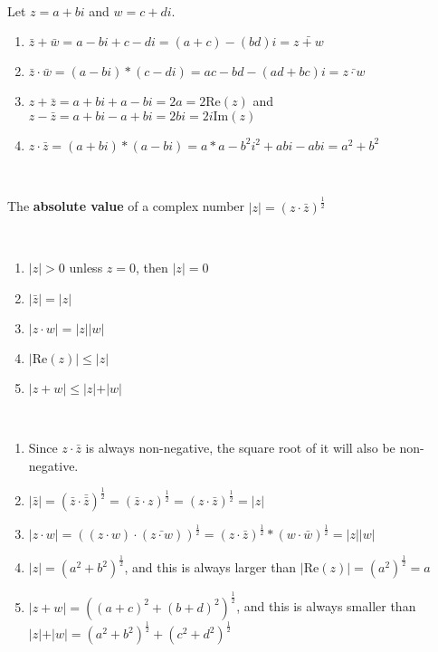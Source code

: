 \documentclass{article}
\begin{document}
\begin{customproof}
\

Let $z = a+bi$ and $w = c+di$.

\begin{enumerate}
    \item $\bar{z} + \bar{w} = a-bi + c - di = (a+c) - (bd)i = \bar{z+w}$
    \item $\bar{z} \cdot \bar{w} = (a-bi) * (c-di) = ac-bd - (ad+bc)i = \bar{z \cdot w}$
    \item $z + \bar{z} = a+bi + a - bi = 2a = 2\text{Re}(z)$ and $z - \bar{z} = a+bi - a + bi = 2bi = 2i \text{Im}(z)$
    \item $z \cdot \bar{z} = (a+bi) * (a-bi) = a*a - b^2i^2 + abi - abi = a^2 + b^2$
\end{enumerate}
\end{customproof}

\begin{definition}
\

The \textbf{absolute value} of a complex number $\vert z \vert = (z \cdot \bar{z})^{\frac{1}{2}}$ 
\end{definition}

\begin{theorem}
\

\begin{enumerate}
    \item $\vert z\vert > 0$ unless $z = 0$, then $\vert z\vert =0$
    \item $\vert \bar{z}\vert  = \vert z\vert$
    \item $\vert z \cdot w\vert = \vert z\vert \vert w\vert$
    \item $\vert \text{Re}(z)\vert \leq \vert z\vert$
    \item $\vert z+w\vert \leq \vert z\vert + \vert w\vert$             
\end{enumerate}
\end{theorem}

\begin{customproof}
\

\begin{enumerate}
    \item Since $z \cdot \bar{z}$ is always non-negative, the square root of it will also be non-negative.
    \item $ \vert \bar{z} \vert = (\bar{z} \cdot \bar{\bar{z}})^{\frac{1}{2}}  =  (\bar{z} \cdot z)^{\frac{1}{2}}  = (z \cdot \bar{z})^{\frac{1}{2}} = \vert z\vert$
    \item $\vert z \cdot w\vert = ((z\cdot w) \cdot (\bar{z\cdot w}))^\frac{1}{2} = (z \cdot \bar{z})^\frac{1}{2} * (w \cdot \bar{w})^\frac{1}{2} = \vert z\vert \vert w\vert$   
    \item $\vert z\vert = (a^2 + b^2)^\frac{1}{2}$, and this is always larger than $\vert \text{Re}(z) \vert = (a^2)^\frac{1}{2} = a$
    \item $\vert z+w \vert  = ((a+c)^2 + (b+d)^2)^\frac{1}{2}$, and this is always smaller than $\vert z \vert + \vert w \vert = (a^2 + b^2)^\frac{1}{2} + (c^2 + d^2)^\frac{1}{2}$
\end{enumerate}
\end{customproof}
\end{document}

